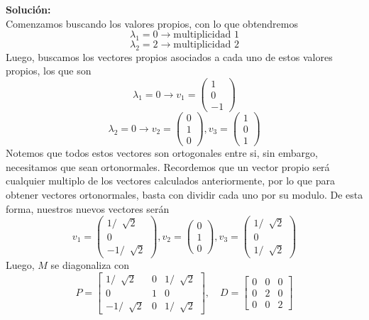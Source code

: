 \documentclass[12pt]{article}
\newenvironment{solucion}
{\begin{mdframed}[backgroundcolor=black!10]
		{\bf Solución:}\\
	}
	{
	\end{mdframed}
}
\newenvironment{preguntas}
{\begin{enumerate}\itemsep12pt
	}
	{
	\end{enumerate}
}
\newcommand{\ra}{\rightarrow}
\begin{document}
\begin{preguntas}
\begin{solucion}
		Comenzamos buscando los valores propios, con lo que obtendremos
		$$\lambda_1 = 0 \ra \text{multiplicidad 1}$$
		$$\lambda_2 = 2 \ra \text{multiplicidad 2}$$
		Luego, buscamos los vectores propios asociados a cada uno de estos valores propios, los que son
		$$\lambda_1 = 0 \ra v_1 = \begin{pmatrix}
		1 \\ 0 \\ -1
		\end{pmatrix}$$
		$$\lambda_2 = 0 \ra v_2 = \begin{pmatrix}
		0 \\ 1 \\ 0
		\end{pmatrix}, v_3 = \begin{pmatrix}
		1 \\ 0 \\ 1
		\end{pmatrix}$$
		Notemos que todos estos vectores son ortogonales entre si, sin embargo, necesitamos que sean ortonormales. Recordemos que un vector propio será cualquier multiplo de los vectores calculados anteriormente, por lo que para obtener vectores ortonormales, basta con dividir cada uno por su modulo. De esta forma, nuestros nuevos vectores serán
		$$v_1 = \begin{pmatrix}
		1/\ \sqrt[]{2} \\ 0 \\ -1/\ \sqrt[]{2}
		\end{pmatrix}, v_2 = \begin{pmatrix}
		0 \\ 1 \\ 0
		\end{pmatrix}, v_3 = \begin{pmatrix}
		1/\ \sqrt[]{2} \\ 0 \\ 1/\ \sqrt[]{2}
		\end{pmatrix}$$
		Luego, $M$ se diagonaliza con
		$$P = \begin{bmatrix}
		1/\ \sqrt[]{2} & 0 & 1/\ \sqrt[]{2} \\
		0 & 1 & 0 \\
		-1/\ \sqrt[]{2} & 0 & 1/\ \sqrt[]{2}
		\end{bmatrix}, \quad D = \begin{bmatrix}
		0 & 0 & 0 \\
		0 & 2 & 0 \\
		0 & 0 & 2
		\end{bmatrix}$$
\end{solucion}

\end{preguntas}
\end{document}
